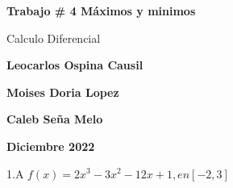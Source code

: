 \documentclass{report}
\begin{document}
\begin{titlepage}


    \centering
    {\bfseries\Huge Trabajo \# 4 M\'aximos y minimos \par}
    \vspace{1cm}
    {\Huge Calculo Diferencial }
    \vspace{1cm}
    \vspace{3cm}
    \vspace{3cm}

    {\bfseries\Huge Leocarlos Ospina Causil \par}
    {\bfseries\Huge Moises Doria Lopez \par}
    {\bfseries\Huge Caleb Seña Melo \par}

    \vfill
    {\bfseries\Huge  Diciembre 2022 \par}
\end{titlepage}

{\Large 1.A $ f(x) = 2x^3 -3x^2 -12x + 1, en [-2,3] $ \par}
\end{document}
